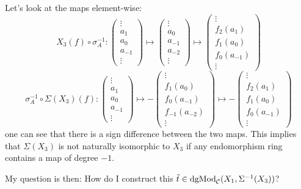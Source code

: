 \begin{question}
\begin{center}
    \end{center}
    Let's look at the maps element-wise:
    \[
        X_3(f) \circ \sigma_A^{-1} :
        \begin{pmatrix}
            \vdots \\
            a_1 \\
            a_0 \\
            a_{-1} \\
            \vdots
        \end{pmatrix}
        \mapsto
        \begin{pmatrix}
            \vdots \\
            a_0 \\
            a_{-1} \\
            a_{-2} \\
            \vdots
        \end{pmatrix}
        \mapsto
        \begin{pmatrix}
            \vdots \\
            f_2(a_1) \\
            f_1(a_0) \\
            f_0(a_{-1}) \\
            \vdots
        \end{pmatrix}
    \]
    \[
        \sigma_A^{-1} \circ \Sigma(X_3)(f) :
        \begin{pmatrix}
            \vdots \\
            a_1 \\
            a_0 \\
            a_{-1} \\
            \vdots
        \end{pmatrix}
        \mapsto
        -
        \begin{pmatrix}
            \vdots \\
            f_1(a_0) \\
            f_0(a_{-1}) \\
            f_{-1}(a_{-2}) \\
            \vdots
        \end{pmatrix}
        \mapsto
        -
        \begin{pmatrix}
            \vdots \\
            f_2(a_1) \\
            f_1(a_0) \\
            f_0(a_{-1}) \\
            \vdots
        \end{pmatrix}
    \]
one can see that there is a sign difference between the two maps. This implies that \( \Sigma(X_3) \) is not naturally isomorphic to \( X_3 \) if any endomorphism ring contains a map of degree \( -1 \).

My question is then: How do I construct this \( \tilde{t} \in \operatorname{dgMod}_{{\mathcal{C}}}(X_1, \Sigma^{-1}(X_3)) \)?
\end{question}

